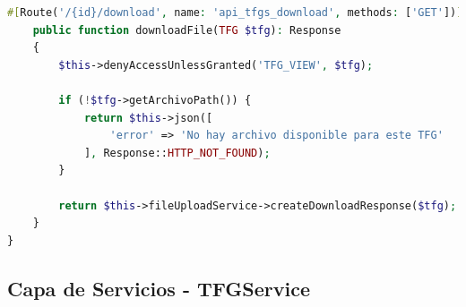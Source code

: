 \documentclass[12pt,a4paper,oneside]{report}
\begin{document}
\begin{lstlisting}[language=PHP]
    #[Route('/{id}/download', name: 'api_tfgs_download', methods: ['GET'])]
    public function downloadFile(TFG $tfg): Response
    {
        $this->denyAccessUnlessGranted('TFG_VIEW', $tfg);

        if (!$tfg->getArchivoPath()) {
            return $this->json([
                'error' => 'No hay archivo disponible para este TFG'
            ], Response::HTTP_NOT_FOUND);
        }

        return $this->fileUploadService->createDownloadResponse($tfg);
    }
}
\end{lstlisting}

\subsection{Capa de Servicios -
TFGService}\label{capa-de-servicios---tfgservice}
\end{document}
